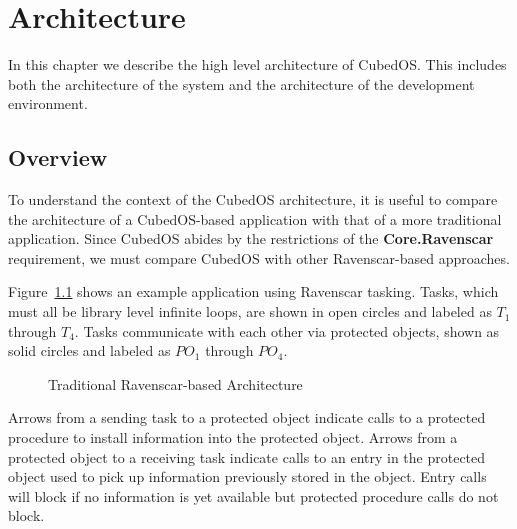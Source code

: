 
\chapter{Architecture}
\label{chapt:architecture}

In this chapter we describe the high level architecture of CubedOS. This includes both the
architecture of the system and the architecture of the development environment.

\section{Overview}
\label{sec:overview}

To understand the context of the CubedOS architecture, it is useful to compare the architecture
of a CubedOS-based application with that of a more traditional application. Since CubedOS abides
by the restrictions of the \textbf{Core.Ravenscar} requirement, we must compare CubedOS with
other Ravenscar-based approaches.

Figure~\ref{fig:traditional-architecture} shows an example application using Ravenscar tasking.
Tasks, which must all be library level infinite loops, are shown in open circles and labeled as
$T_1$ through $T_4$. Tasks communicate with each other via protected objects, shown as solid
circles and labeled as $PO_1$ through $PO_4$.

\begin{figure}[tbhp]
  \center
  \caption{Traditional Ravenscar-based Architecture}
  \label{fig:traditional-architecture}
\end{figure}

Arrows from a sending task to a protected object indicate calls to a protected procedure to
install information into the protected object. Arrows from a protected object to a receiving
task indicate calls to an entry in the protected object used to pick up information previously
stored in the object. Entry calls will block if no information is yet available but protected
procedure calls do not block.

